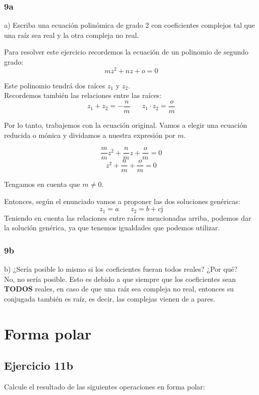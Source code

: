 \documentclass[11pt]{article}
\def\imj{\mathrm{j}}
\begin{document}
	\subsubsection{9a}
	a) Escriba una ecuación polinómica de grado 2 con coeficientes complejos tal que una raíz sea real y la otra compleja no real.
	
	Para resolver este ejercicio recordemos la ecuación de un polinomio de segundo grado:
	$$mz^{2}+nz+o=0$$
	
	Este polinomio tendrá dos raíces $z_{1}$ y $z_{2}$.\\
	Recordemos también las relaciones entre las raíces:
	$$z_{1}+z_{2}=-\frac{n}{m} \;\;\;\;\;\; z_{1} \cdot z_{2} = \frac{o}{m} $$
	
	Por lo tanto, trabajemos con la ecuación original. Vamos a elegir una ecuación reducida o mónica y dividamos a nuestra expresión por $m$.
	
	$$\frac{m}{m}z^2+\frac{n}{m}z+\frac{o}{m}=0$$
	$$z^2+\frac{n}{m}+\frac{o}{m}=0$$
	\begin{center}
		Tengamos en cuenta que $m\neq0$.
	\end{center}
	Entonces, según el enunciado vamos a proponer las dos soluciones genéricas:
	$$z_{1}=a\;\;\;\;\;\;z_{2}=b+c\imj$$
	Teniendo en cuenta las relaciones entre raíces mencionadas arriba, podemos dar la solución genérica, ya que tenemos igualdades que podemos utilizar.
	\begin{center}
		\fcolorbox{black}{yellow}{$z^{2}+(a+b+c\imj)z+a(b+c\imj)=0$}
	\end{center}
	
	
	\subsubsection{9b}
	b) ¿Sería posible lo mismo si los coeficientes fueran todos reales? ¿Por qué? \\
	No, no sería posible. Esto es debido a que siempre que los coeficientes sean \textbf{TODOS} reales, en caso de que una raíz sea compleja no real, entonces su conjugada también es raíz, es decir, las complejas vienen de a pares.
	\section{Forma polar}
	\subsection{Ejercicio 11b}
	Calcule el resultado de las siguientes operaciones en forma polar:
	
\end{document}
